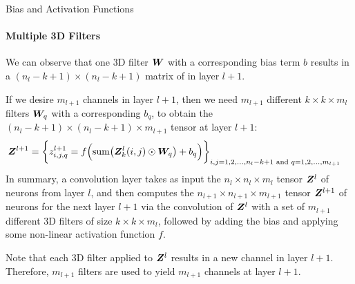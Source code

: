 %
%
%
%
\begin{frame}{Bias and Activation Functions}
\framesubtitle{Multiple 3D Filters}
We can observe that one 3D filter ${\boldsymbol W}$ with a corresponding bias
term $b$ results in a $(n_l-k+1) \times (n_l-k+1)$ matrix of
in layer $l+1$. 

\medskip

If we desire $m_{l+1}$ channels
in layer $l+1$, then we need $m_{l+1}$ different $k \times k \times m_l$ 
filters ${\boldsymbol W}_q$ with a corresponding $b_q$, to
obtain the $(n_l-k+1) \times (n_l-k+1) \times m_{l+1}$ tensor 
at layer $l+1$:
\begin{align*}
    {\boldsymbol Z}^{l+1} & = \biggl\{ z^{l+1}_{i,j,q} 
    = f\Bigl(\operatorname*{sum}\bigl( {\boldsymbol Z}^l_k(i,j) \odot {\boldsymbol W}_q \bigr)
        + b_q
\Bigr) \biggr\}_{i,j=1,2,\ldots, n_l-k+1 \text{ and } q = 1,2, \ldots, m_{l+1}}
\end{align*}
%
In summary, a convolution layer takes as input the $n_l \times n_l
\times m_l$ tensor ${\boldsymbol Z}^l$ of neurons from layer $l$, 
and then computes the $n_{l+1} \times n_{l+1} \times m_{l+1}$ tensor
${\boldsymbol Z}^{l+1}$ of
neurons for the next layer $l+1$ via
the convolution of ${\boldsymbol Z}^l$ with a set of $m_{l+1}$ different 3D filters of size $k
\times k \times m_l$, followed by adding the bias and applying some
non-linear activation function $f$. 

	\medskip

	Note that each 3D filter applied to
${\boldsymbol Z}^l$ results in a new channel in layer $l+1$. Therefore, $m_{l+1}$
filters are used to yield $m_{l+1}$ channels at layer $l+1$.
\end{frame}
%
%
